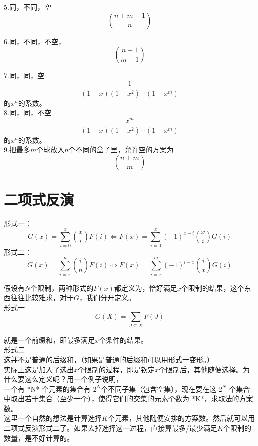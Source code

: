 5.同，不同，空
$$
\binom{n+m-1}{n}
$$

6.同，不同，不空，
$$
\binom{n-1}{m-1}
$$

7.同，同，空
$$
\frac{1}{(1-x)(1-x^2)\cdots (1-x^m)}
$$
的$x^n$的系数。\\

8.同，同，不空
$$
\frac{x^m}{(1-x)(1-x^2)\cdots (1-x^m)}
$$
的$x^n$的系数。\\

9.把最多$m$个球放入$n$个不同的盒子里，允许空的方案为
$$
\binom{n+m}{m}
$$



\section{二项式反演}

\begin{theorem}
形式一：\\
$$
G(x)=\sum_{i=0}^{x}\binom{x}{i} F(i) \iff F(x)=\sum_{i=0}^{x} (-1)^{x-i}\binom{x}{i} G(i)
$$
形式二：\\
$$
G(x)=\sum_{i=x}^{n} \binom{i}{n} F(i) \iff F(x)=\sum_{i=x}^{m}(-1)^{i-x}\binom{i}{x}G(i)
$$
\end{theorem}

假设有$N$个限制，两种形式的$F(x)$都定义为，恰好满足$x$个限制的结果，这个东西往往比较难求，对于$G$，我们分开定义。\\

形式一\\

$$
G(X)=\sum_{J \subseteq X} F(J)
$$

就是一个前缀和，即最多满足$x$个条件的结果。\\

形式二\\

这并不是普通的后缀和，（如果是普通的后缀和可以用形式一变形。）\\

实际上这是加入了选出$x$个限制的过程，即是钦定$x$个限制后，其他随便选择。为什么要这么定义呢？用一个例子说明，\\

一个有 *N* 个元素的集合有 $2^{N}$个不同子集（包含空集），现在要在这 $2^{N}$ 个集合中取出若干集合（至少一个），使得它们的交集的元素个数为 *K*，求取法的方案数。\\

这里一个自然的想法是计算选择$K$个元素，其他随便安排的方案数。然后就可以用二项式反演形式二了。如果去掉选择这一过程，直接算最多/最少满足$K$个限制的数量，是不好计算的。\\